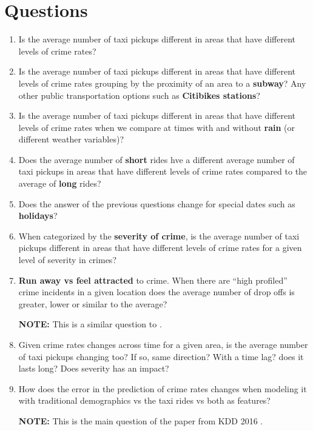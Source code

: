\documentclass[12pt,letterpaper,english]{article}
\theoremstyle{definition}
\begin{document}
\section{Questions}
\begin{enumerate}
	\item Is the average number of taxi pickups different in areas that have different levels of crime rates?

	\item Is the average number of taxi pickups different in areas that have different levels of crime rates grouping by the proximity of an area to a \textbf{subway}? Any other public transportation options such as \textbf{Citibikes stations}?

	\item Is the average number of taxi pickups different in areas that have different levels of crime rates when we compare at times with and without \textbf{rain} (or different weather variables)?

	\item Does the average  number of \textbf{short} rides hve a different average number of taxi pickups  in areas that have different levels of crime rates  compared to the average of \textbf{long} rides?

	\item Does the answer of the previous questions change for special dates such as \textbf{holidays}?

	\item When categorized by the \textbf{severity of crime}, is the average number of taxi pickups different in areas that have different levels of crime rates for a given level of severity in crimes?

	\item \textbf{Run away vs feel attracted} to crime. When there are ``high profiled'' crime incidents in a given location does the average number of drop offs is greater, lower or similar to the average?

	\textbf{NOTE:} This is a similar question to \cite{Bendler14}. 

	\item Given crime rates changes across time for a given area, is the average number of taxi pickups  changing too? If so, same direction? With a time lag?
	does it lasts long? Does severity has an impact?

	\item How does the error in the prediction of crime rates changes when modeling it with traditional demographics vs the taxi rides vs both as features? 

	\textbf{NOTE:} This is the main question of the paper from KDD 2016 \cite{crimeRate}. 






\end{enumerate}



 
\end{document}
